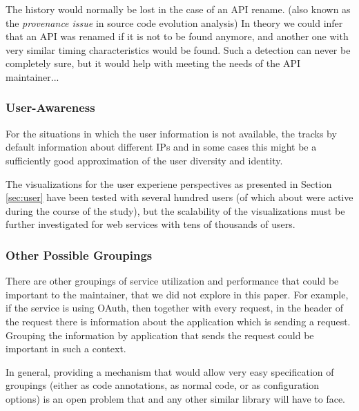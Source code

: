     The history would normally be lost in the case of an API rename. (also known as the {\em provenance issue} in source code evolution analysis)
    In theory we could infer that an API was renamed if it is not to be found anymore, and another one with very similar timing characteristics would be found. Such a detection can never be completely sure, but it would help with meeting the needs of the API maintainer... 

  \subsubsection{User-Awareness }

    For the situations in which the user information is not available, the \tool tracks by default information about different IPs and in some cases this might be a sufficiently good approximation of the user diversity and identity. 

    The visualizations for the user experiene perspectives as presented in Section \ref{sec:user} have been tested with several hundred users (of which about \activeUserCount were active during the course of the study), but the scalability of the visualizations must be further investigated for web services with tens of thousands of users.


  \subsubsection{Other Possible Groupings}

    There are other groupings of service utilization and performance that could be important to the maintainer, that we did not explore in this paper. For example, if the service is using OAuth, then together with every request, in the header of the request there is information about the application which is sending a request. Grouping the information by application that sends the request could be important in such a context. 

    In general, providing a mechanism that would allow very easy specification of groupings (either as code annotations, as normal code, or as configuration options) is an open problem that \tool and any other similar library will have to face.

